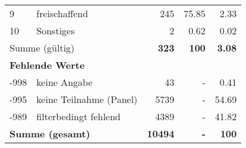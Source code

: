 \begin{longtable}{lXrrr}
     9 &
     \multicolumn{1}{X}{ freischaffend   } &


       \num{245} &
       \num[round-mode=places,round-precision=2]{75,85} &
         \num[round-mode=places,round-precision=2]{2,33} \\

     10 &
     \multicolumn{1}{X}{ Sonstiges   } &


       \num{2} &
       \num[round-mode=places,round-precision=2]{0,62} &
         \num[round-mode=places,round-precision=2]{0,02} \\
     \midrule
     \multicolumn{2}{l}{Summe (gültig)} &
       \textbf{\num{323}} &
     \textbf{100} &
       \textbf{\num[round-mode=places,round-precision=2]{3,08}} \\
     \multicolumn{5}{l}{\textbf{Fehlende Werte}}\\
       -998 &
       keine Angabe &
         \num{43} &
        - &
         \num[round-mode=places,round-precision=2]{0,41} \\
       -995 &
       keine Teilnahme (Panel) &
         \num{5739} &
        - &
         \num[round-mode=places,round-precision=2]{54,69} \\
       -989 &
       filterbedingt fehlend &
         \num{4389} &
        - &
         \num[round-mode=places,round-precision=2]{41,82} \\
     \midrule
     \multicolumn{2}{l}{\textbf{Summe (gesamt)}} &
          \textbf{\num{10494}} &
        \textbf{-} &
        \textbf{100} \\
     \bottomrule
     \end{longtable}
     
